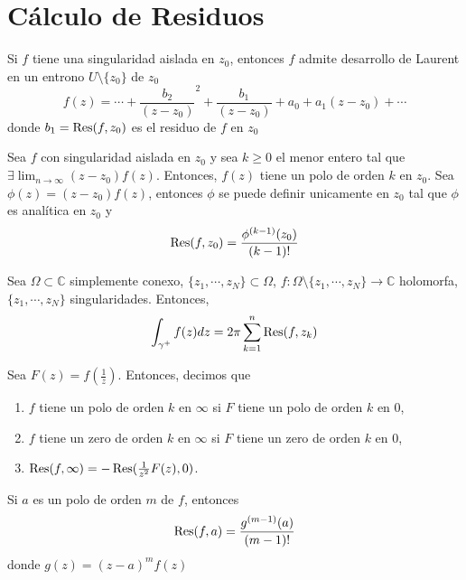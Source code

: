 \section{Cálculo de Residuos}

\begin{note}
  Si $f$ tiene una singularidad aislada en $z_{0}$, entonces $f$ admite desarrollo de Laurent en un entrono $U \setminus \{ z_{0} \}$ de $z_{0}$
  \[ 
    f(z) = \cdots + \frac{b_{2}}{(z - z_{0})}^{2} + \frac{b_{1}}{(z - z_{0})} + a_{0} + a_{1}(z - z_{0}) + \cdots 
  \] 
  donde $b_{1} = \operatorname{Res} (f, z_{0})$ es el residuo de $f$ en $z_{0}$
\end{note}

\begin{prop}
  Sea $f$ con singularidad aislada en $z_{0}$ y sea $k \geq 0$ el menor entero tal que $\exists \lim_{n \to \infty} (z - z_{0}) f(z)$. Entonces, $f(z)$ tiene un polo de orden $k$ en $z_{0}$. Sea $\phi(z) = (z - z_{0}) f(z)$, entonces $\phi$ se puede definir unicamente en $z_{0}$ tal que $\phi$ es analítica en $z_{0}$ y
  \[ 
    \operatorname{Res}(f, z_{0}) = \frac{\phi^{(k-1)}(z_{0})}{(k-1)!} 
  \] 
\end{prop}

\begin{theo}
  Sea $\Omega \subset \mathbb{C}$ simplemente conexo, $\{ z_{1}, \cdots, z_{N} \} \subset \Omega$, $f : \Omega \setminus \{ z_{1}, \cdots, z_{N} \} \to \mathbb{C}$ holomorfa, $\{ z_{1}, \cdots, z_{N} \}$ singularidades. Entonces, 
  \[ 
    \int_{\gamma^{+}}^{} f(z) dz = 2 \pi \sum_{k = 1}^{n} \operatorname{Res} (f, z_{k})
  \] 
\end{theo}

\begin{defn}
  Sea $F(z) = f(\frac{1}{z})$. Entonces, decimos que
  \begin{enumerate}[label=(\roman*)]
    \item $f$ tiene un polo de orden $k$ en $\infty$ si $F$ tiene un polo de orden $k$ en $0$,
    \item $f$ tiene un zero de orden $k$ en $\infty$ si $F$ tiene un zero de orden $k$ en $0$,
    \item $\operatorname{Res}(f, \infty) = -  \operatorname{Res}(\frac{1}{z^{2}}F(z), 0)$.
  \end{enumerate}
\end{defn}

\begin{prop}
  Si $a$ es un polo de orden $m$ de $f$, entonces
  \[
    \operatorname{Res} (f,a) = \frac{g^{(m-1)}(a)}{(m - 1)!}
  \]
  donde $g(z) = (z - a)^{m} f(z)$
\end{prop}
